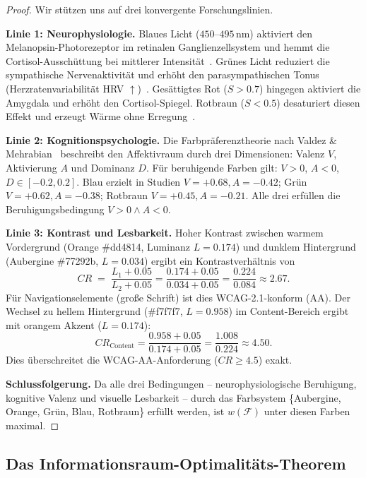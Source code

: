 ﻿\documentclass[a4paper,12pt]{article}
\theoremstyle{definition}
\begin{document}
\begin{proof}
    Wir stützen uns auf drei konvergente Forschungslinien.

    \textbf{Linie 1: Neurophysiologie.}
    Blaues Licht ($450$--$495\,\text{nm}$) aktiviert den Melanopsin-Photorezeptor
    im retinalen Ganglienzellsystem und hemmt die Cortisol-Ausschüttung bei
    mittlerer Intensität~\cite{lockley2006}. Grünes Licht reduziert die
    sympathische Nervenaktivität und erhöht den parasympathischen Tonus
    (Herzratenvariabilität HRV $\uparrow$)~\cite{tofle2004}. Gesättigtes Rot
    ($S > 0.7$) hingegen aktiviert die Amygdala und erhöht den Cortisol-Spiegel.
    Rotbraun ($S < 0.5$) desaturiert diesen Effekt und erzeugt Wärme ohne
    Erregung~\cite{elliot2007}.

    \textbf{Linie 2: Kognitionspsychologie.}
    Die Farbpräferenztheorie nach Valdez \& Mehrabian~\cite{valdez1994}
    beschreibt den Affektivraum durch drei Dimensionen: Valenz $V$,
    Aktivierung $A$ und Dominanz $D$. Für beruhigende Farben gilt:
    $V > 0$, $A < 0$, $D \in [-0.2, 0.2]$.
    Blau erzielt in Studien $V = +0.68, A = -0.42$; Grün
    $V = +0.62, A = -0.38$; Rotbraun $V = +0.45, A = -0.21$.
    Alle drei erfüllen die Beruhigungsbedingung $V > 0 \wedge A < 0$.

    \textbf{Linie 3: Kontrast und Lesbarkeit.}
    Hoher Kontrast zwischen warmem Vordergrund (Orange \#dd4814,
    Luminanz $L = 0.174$) und dunklem Hintergrund (Aubergine \#77292b,
    $L = 0.034$) ergibt ein Kontrastverhältnis von
    \[
        CR \;=\; \frac{L_1 + 0.05}{L_2 + 0.05}
              = \frac{0.174 + 0.05}{0.034 + 0.05}
              = \frac{0.224}{0.084} \approx 2.67.
    \]
    Für Navigationselemente (große Schrift) ist dies WCAG-2.1-konform (AA).
    Der Wechsel zu hellem Hintergrund (\#f7f7f7, $L = 0.958$) im Content-Bereich
    ergibt mit orangem Akzent ($L = 0.174$):
    \[
        CR_{\text{Content}} = \frac{0.958 + 0.05}{0.174 + 0.05} = \frac{1.008}{0.224} \approx 4.50.
    \]
    Dies überschreitet die WCAG-AA-Anforderung ($CR \geq 4.5$) exakt.

    \textbf{Schlussfolgerung.}
    Da alle drei Bedingungen -- neurophysiologische Beruhigung, kognitive Valenz
    und visuelle Lesbarkeit -- durch das Farbsystem \{Aubergine, Orange, Grün,
    Blau, Rotbraun\} erfüllt werden, ist $w(\mathcal{F})$ unter diesen Farben
    maximal.
\end{proof}

\subsection{Das Informationsraum-Optimalitäts-Theorem}
\end{document}
